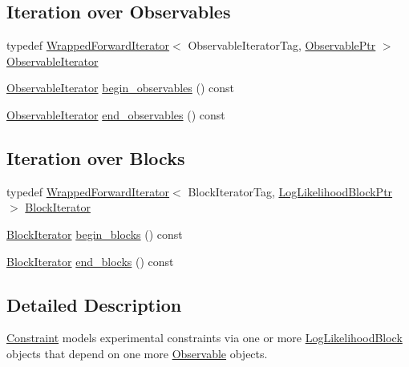 \subsection*{Iteration over Observables}
\label{_amgrp6aae7b5ccd01d1d0eccf18c178826586}
 \begin{DoxyCompactItemize}
\item 
typedef \hyperlink{classeos_1_1WrappedForwardIterator}{WrappedForwardIterator}$<$ ObservableIteratorTag, \hyperlink{namespaceeos_a470e5dd806bd129080f1aa0c2954646f}{ObservablePtr} $>$ \hyperlink{classeos_1_1Constraint_a44010ea20596a593325202033743f357}{ObservableIterator}
\item 
\hyperlink{classeos_1_1WrappedForwardIterator}{ObservableIterator} \hyperlink{classeos_1_1Constraint_a9822827a09ecb630ec2b6640ce4306c0}{begin\_\-observables} () const 
\item 
\hyperlink{classeos_1_1WrappedForwardIterator}{ObservableIterator} \hyperlink{classeos_1_1Constraint_aa6cb38bbe55f1fd59f921716bc78d4c9}{end\_\-observables} () const 
\end{DoxyCompactItemize}
\subsection*{Iteration over Blocks}
\label{_amgrpe3eb96865b920e07e7c9f7e5d3e38fbb}
 \begin{DoxyCompactItemize}
\item 
typedef \hyperlink{classeos_1_1WrappedForwardIterator}{WrappedForwardIterator}$<$ BlockIteratorTag, \hyperlink{namespaceeos_ab823a6782e060c440e05a614158ad1bf}{LogLikelihoodBlockPtr} $>$ \hyperlink{classeos_1_1Constraint_a44726a3e0954f645183b9e28d911345a}{BlockIterator}
\item 
\hyperlink{classeos_1_1WrappedForwardIterator}{BlockIterator} \hyperlink{classeos_1_1Constraint_a0bc3a182079de99618a9edec6bfd8512}{begin\_\-blocks} () const 
\item 
\hyperlink{classeos_1_1WrappedForwardIterator}{BlockIterator} \hyperlink{classeos_1_1Constraint_a8b6747caa6cf920d064e3a306224f4ef}{end\_\-blocks} () const 
\end{DoxyCompactItemize}


\subsection{Detailed Description}
\hyperlink{classeos_1_1Constraint}{Constraint} models experimental constraints via one or more \hyperlink{classeos_1_1LogLikelihoodBlock}{LogLikelihoodBlock} objects that depend on one more \hyperlink{classeos_1_1Observable}{Observable} objects. 


